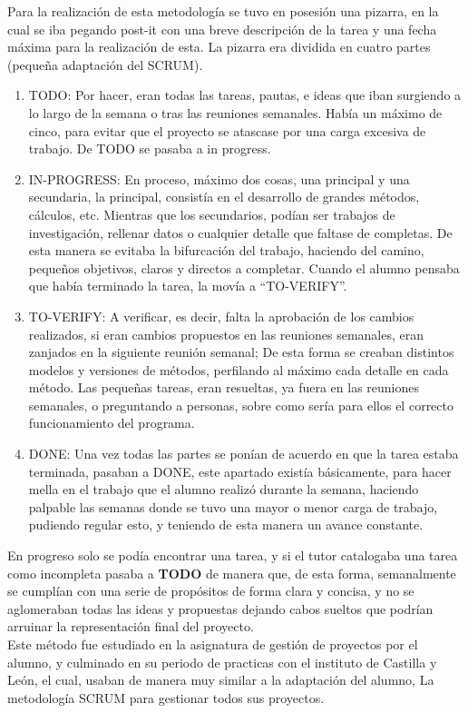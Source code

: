 Para la realización de esta metodología se tuvo en posesión una pizarra, en la cual se iba pegando post-it con una breve descripción de la tarea y una fecha máxima para la realización de esta. La pizarra era dividida en cuatro partes (pequeña adaptación del SCRUM).\\
\begin{enumerate}
\item	TODO: Por hacer, eran todas las tareas, pautas, e ideas que iban surgiendo a lo largo de la semana o tras las reuniones semanales. Había un máximo de cinco, para evitar que el proyecto se atascase por una carga excesiva de trabajo. De TODO se pasaba a in progress. 
\item	IN-PROGRESS: En proceso, máximo dos cosas, una principal y una secundaria, la principal, consistía en el desarrollo de grandes métodos, cálculos, etc. Mientras que los secundarios, podían ser trabajos de investigación, rellenar datos o cualquier detalle que faltase de completas. De esta manera se evitaba la bifurcación del trabajo, haciendo del camino, pequeños objetivos, claros y directos a completar. Cuando el alumno pensaba que había terminado la tarea, la movía a “TO-VERIFY”.
\item	TO-VERIFY: A verificar, es decir, falta la aprobación de los cambios realizados, si eran cambios propuestos en las reuniones semanales, eran zanjados en la siguiente reunión semanal; De esta forma se creaban distintos modelos y versiones de métodos, perfilando al máximo cada detalle en cada método. Las pequeñas tareas, eran resueltas, ya fuera en las reuniones semanales, o preguntando a personas, sobre como sería para ellos el correcto funcionamiento del programa.
\item	DONE: Una vez todas las partes se ponían de acuerdo en que la tarea estaba terminada, pasaban a DONE, este apartado existía básicamente, para hacer mella en el trabajo que el alumno realizó durante la semana, haciendo palpable las semanas donde se tuvo una mayor o menor carga de trabajo, pudiendo regular esto, y teniendo de esta manera un avance constante.
\end{enumerate}
En progreso solo se podía encontrar una tarea, y si el tutor catalogaba una tarea como incompleta pasaba a \textbf{TODO} de manera que, de esta forma, semanalmente se cumplían con una serie de propósitos de forma clara y concisa, y no se aglomeraban todas las ideas y propuestas dejando  cabos sueltos que podrían arruinar la representación final del proyecto. \\
Este método fue estudiado en la asignatura de gestión de proyectos por el alumno, y culminado en su periodo de practicas con el instituto de Castilla y León, el cual, usaban de manera muy similar a la adaptación del alumno, La metodología SCRUM para gestionar todos sus proyectos.\\

